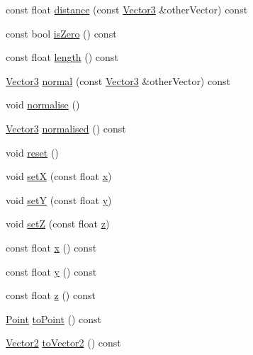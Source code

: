 \begin{DoxyCompactItemize}
\item 
const float \hyperlink{classprism_1_1_vector3_a72eac07134d9a15a6f87f9fd29cc716a}{distance} (const \hyperlink{classprism_1_1_vector3}{Vector3} \&other\+Vector) const 
\item 
const bool \hyperlink{classprism_1_1_vector3_ab8ee6e427e50070a85aeb07d417b7ea1}{is\+Zero} () const 
\item 
const float \hyperlink{classprism_1_1_vector3_a0d0e7d76a7c50f29bc37b8176eb04d32}{length} () const 
\item 
\hyperlink{classprism_1_1_vector3}{Vector3} \hyperlink{classprism_1_1_vector3_a3dea9d05ac3786470ecaaac2e9e1fbfb}{normal} (const \hyperlink{classprism_1_1_vector3}{Vector3} \&other\+Vector) const 
\item 
void \hyperlink{classprism_1_1_vector3_a26d76e02209e76bc883ed8e4ba337dd8}{normalise} ()
\item 
\hyperlink{classprism_1_1_vector3}{Vector3} \hyperlink{classprism_1_1_vector3_afb7639a382c2b249ea291731c2cb1ed3}{normalised} () const 
\item 
void \hyperlink{classprism_1_1_vector3_a848d54404144dc09f32d6065e91aa6a1}{reset} ()
\item 
void \hyperlink{classprism_1_1_vector3_a6a8df0f4941b7dab881a88f08f20555f}{setX} (const float \hyperlink{classprism_1_1_vector3_a6cd6b0776fc0eae2068f2610b882bb9f}{x})
\item 
void \hyperlink{classprism_1_1_vector3_a14e54c21f7b7349bdc0accdba8bdf27e}{setY} (const float \hyperlink{classprism_1_1_vector3_ad1e152047e314b334b4ccb5ab665640c}{y})
\item 
void \hyperlink{classprism_1_1_vector3_a11737fc5a6e49ccea73916795ed26d1a}{setZ} (const float \hyperlink{classprism_1_1_vector3_af760dbfa2ae9747794f1a542395306b8}{z})
\item 
const float \hyperlink{classprism_1_1_vector3_a6cd6b0776fc0eae2068f2610b882bb9f}{x} () const 
\item 
const float \hyperlink{classprism_1_1_vector3_ad1e152047e314b334b4ccb5ab665640c}{y} () const 
\item 
const float \hyperlink{classprism_1_1_vector3_af760dbfa2ae9747794f1a542395306b8}{z} () const 
\item 
\hyperlink{classprism_1_1_point}{Point} \hyperlink{classprism_1_1_vector3_adad7647133bf35b64789b0418f2d1c67}{to\+Point} () const 
\item 
\hyperlink{classprism_1_1_vector2}{Vector2} \hyperlink{classprism_1_1_vector3_adc9274bb1950e14acadcff0346732d2e}{to\+Vector2} () const 

\end{DoxyCompactItemize}
